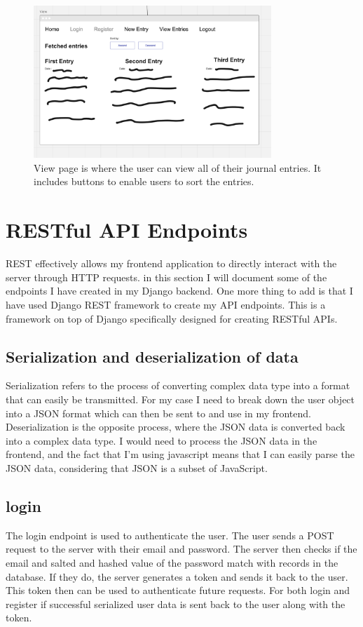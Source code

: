 \begin{figure}[H]
    \centering
    \includegraphics[width=0.8\textwidth]{Assets/view_page.png}
    \caption{View page is where the user can view all of their journal entries. It includes buttons to enable users to sort the entries.}
\end{figure}


\section{RESTful API Endpoints}
REST effectively allows my frontend application to directly interact with the server through HTTP requests. in this section I will document some of the endpoints I have created in my Django backend. One more thing to add is that I have used Django REST framework to create my API endpoints. This is a framework on top of Django specifically designed for creating RESTful APIs.

\subsection{Serialization and deserialization of data}
Serialization refers to the process of converting complex data type into a format that can easily be transmitted. For my case I need to break down the user object into a JSON format which can then be sent to and use in my frontend. Deserialization is the opposite process, where the JSON data is converted back into a complex data type. I would need to process the JSON data in the frontend, and the fact that I'm using javascript means that I can easily parse the JSON data, considering that JSON is a subset of JavaScript.

\subsection{login}
The login endpoint is used to authenticate the user. The user sends a POST request to the server with their email and password. The server then checks if the email and salted and hashed value of the password match with records in the database. If they do, the server generates a token and sends it back to the user. This token then can be used to authenticate future requests. For both login and register if successful serialized user data is sent back to the user along with the token.

